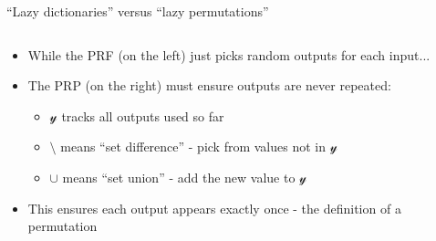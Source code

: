 \documentclass[aspectratio=169, lualatex, handout]{beamer}
\begin{document}
\begin{frame}{``Lazy dictionaries'' versus ``lazy permutations''}
	\begin{columns}[c]
		\begin{column}{0.5\textwidth}
			\begin{itemize}[<+->]
				\item While the PRF (on the left) just picks random outputs for each input...
				\item The PRP (on the right) must ensure outputs are never repeated:
				      \begin{itemize}[<+->]
					      \item $\mathcal{y}$ tracks all outputs used so far
					      \item $\setminus$ means ``set difference'' - pick from values not in $\mathcal{y}$
					      \item $\cup$ means ``set union'' - add the new value to $\mathcal{y}$
				      \end{itemize}
				\item This ensures each output appears exactly once - the definition of a permutation
			\end{itemize}
		\end{column}
		\begin{column}{0.5\textwidth}
			\begin{center}
			\end{center}
		\end{column}
	\end{columns}
\end{frame}
\end{document}
